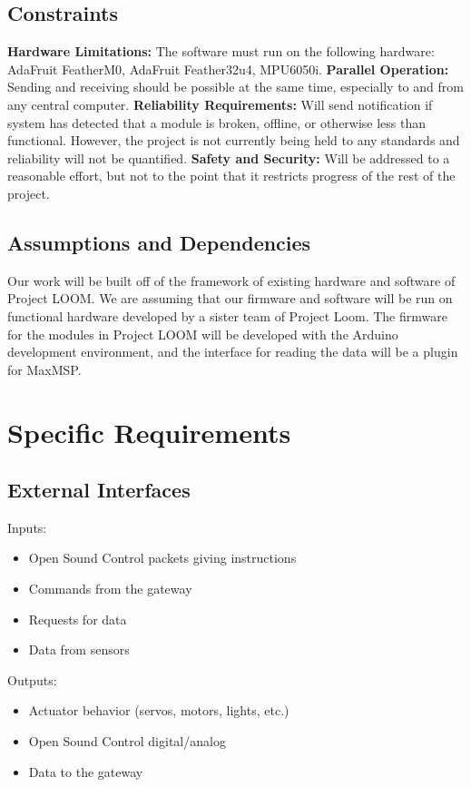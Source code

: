 \documentclass[onecolumn, draftclsnofoot,10pt, compsoc]{IEEEtran}
\begin{document}
	\subsection{Constraints}
		\textbf{Hardware Limitations:} The software must run on the following hardware: AdaFruit FeatherM0, AdaFruit Feather32u4, MPU6050i. \newline
		\textbf{Parallel Operation:} Sending and receiving should be possible at the same time, especially to and from any central computer. \newline
		\textbf{Reliability Requirements:} Will send notification if system has detected that a module is broken, offline, or otherwise less than functional. However, the project is not currently being held to any standards and reliability will not be quantified. \newline
		\textbf{Safety and Security:} Will be addressed to a reasonable effort, but not to the point that it restricts progress of the rest of the project.
	
	\subsection{Assumptions and Dependencies}
	Our work will be built off of the framework of existing hardware and software of Project LOOM. We are assuming that our firmware and software will be run on functional hardware developed by a sister team of Project Loom. The firmware for the modules in Project LOOM will be developed with the Arduino development environment, and the interface for reading the data will be a plugin for MaxMSP.

\section{Specific Requirements}
	\subsection{External Interfaces}
	Inputs: 
	\begin{itemize}
		\item Open Sound Control packets giving instructions
		\item Commands from the gateway
		\item Requests for data
		\item Data from sensors
	\end{itemize}
	Outputs: 
	\begin{itemize}
		\item Actuator behavior (servos, motors, lights, etc.)
		\item Open Sound Control digital/analog 
		\item Data to the gateway
	\end{itemize}
	
\end{document}

